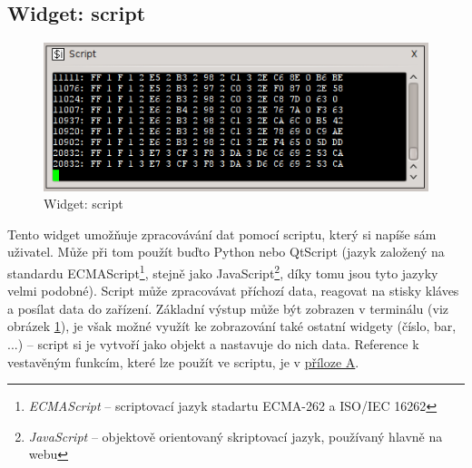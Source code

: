 \documentclass[12pt, a4paper, oneside]{article}
\newcommand{\It}{\textit}  %
\begin{document}
\subsection{Widget: script}
\begin{figure}[h]
\begin{center}
\includegraphics[scale=0.8]{img/w_script.png}
\caption{Widget: script}
\label{script_w}
\end{center}
\end{figure}
Tento widget umožňuje zpracovávání dat pomocí scriptu, který si napíše sám uživatel. Může při tom použít buďto Python nebo QtScript\cite{qtscript} (jazyk založený na standardu ECMAScript\footnote{\It{ECMAScript} -- scriptovací jazyk stadartu ECMA-262 a ISO/IEC 16262}, stejně jako JavaScript\footnote{\It{JavaScript} -- objektově orientovaný skriptovací jazyk, používaný hlavně na webu}, díky tomu jsou tyto jazyky velmi podobné). Script může zpracovávat příchozí data, reagovat na stisky kláves a posílat data do zařízení. Základní výstup může být zobrazen v terminálu (viz obrázek \ref{script_w}), je však možné využít ke zobrazování také ostatní widgety (číslo, bar, ...) -- script si je vytvoří jako objekt a nastavuje do nich data. Reference k vestavěným funkcím, které lze použít ve scriptu, je v \hyperref[script_ref]{příloze A}.
\end{document}
